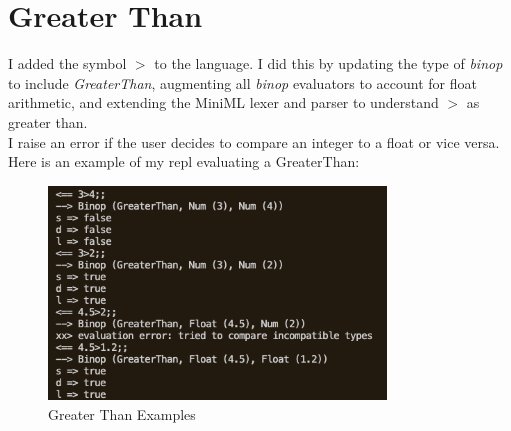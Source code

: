 \documentclass{article}
\begin{document}
\section{Greater Than}
I added the symbol $>$ to the language. I did this by updating the type of \textit{binop} to include \textit{GreaterThan}, augmenting all \textit{binop} evaluators to account for float arithmetic, and extending the MiniML lexer and parser to understand $>$ as greater than.\\I raise an error if the user decides to compare an integer to a float or vice versa. \\
Here is an example of my repl evaluating a GreaterThan:
\begin{figure}[h]\begin{center}
    \includegraphics[width =0.8\textwidth]{greaterthan.png}
    \caption{Greater Than Examples}
\end{center} \end{figure}
\\\\\
\end{document}
